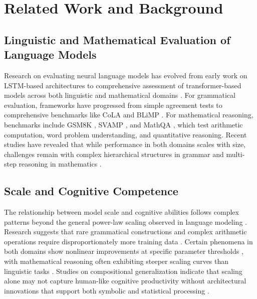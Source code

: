 \documentclass{article}
\begin{document}
\section{Related Work and Background}

\subsection{Linguistic and Mathematical Evaluation of Language Models}
Research on evaluating neural language models has evolved from early work on LSTM-based architectures \citep{linzen2016assessing} to comprehensive assessment of transformer-based models across both linguistic and mathematical domains \citep{goldberg2019assessing, devlin2019bert, saxton2019analysing}. For grammatical evaluation, frameworks have progressed from simple agreement tests to comprehensive benchmarks like CoLA \citep{warstadt2019neural} and BLiMP \citep{warstadt2020blimp}. For mathematical reasoning, benchmarks include GSM8K \citep{cobbe2021training}, SVAMP \citep{patel2021nlpforml}, and MathQA \citep{amini2019mathqa}, which test arithmetic computation, word problem understanding, and quantitative reasoning. Recent studies have revealed that while performance in both domains scales with size, challenges remain with complex hierarchical structures in grammar and multi-step reasoning in mathematics \citep{thrush2022winograd, qian2022limitations, lewkowycz2022solving}.

\subsection{Scale and Cognitive Competence}
The relationship between model scale and cognitive abilities follows complex patterns beyond the general power-law scaling observed in language modeling \citep{kaplan2020scaling}. Research suggests that rare grammatical constructions and complex arithmetic operations require disproportionately more training data \citep{wei2021frequency, patel2021nlpforml}. Certain phenomena in both domains show nonlinear improvements at specific parameter thresholds \citep{zhang2023language}, with mathematical reasoning often exhibiting steeper scaling curves than linguistic tasks \citep{rae2021scaling}. Studies on compositional generalization indicate that scaling alone may not capture human-like cognitive productivity without architectural innovations that support both symbolic and statistical processing \citep{hu2020systematic, lake2022human}.
\end{document}
